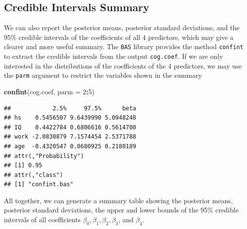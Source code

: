 \documentclass[]{book}
\newenvironment{Shaded}{\begin{snugshade}}{\end{snugshade}}
\newcommand{\KeywordTok}[1]{\textcolor[rgb]{0.13,0.29,0.53}{\textbf{#1}}}
\newcommand{\DataTypeTok}[1]{\textcolor[rgb]{0.13,0.29,0.53}{#1}}
\newcommand{\DecValTok}[1]{\textcolor[rgb]{0.00,0.00,0.81}{#1}}
\newcommand{\StringTok}[1]{\textcolor[rgb]{0.31,0.60,0.02}{#1}}
\newcommand{\CommentTok}[1]{\textcolor[rgb]{0.56,0.35,0.01}{\textit{#1}}}
\newcommand{\OperatorTok}[1]{\textcolor[rgb]{0.81,0.36,0.00}{\textbf{#1}}}
\newcommand{\NormalTok}[1]{#1}
\theoremstyle{definition}
\theoremstyle{definition}
\theoremstyle{definition}
\theoremstyle{remark}
\begin{document}
\subsection{Credible Intervals
Summary}\label{credible-intervals-summary}

We can also report the posterior means, posterior standard deviations,
and the 95\% credible intervals of the coefficients of all 4 predictors,
which may give a clearer and more useful summary. The \texttt{BAS}
library provides the method \texttt{confint} to extract the credible
intervals from the output \texttt{cog.coef}. If we are only interested
in the distributions of the coefficients of the 4 predictors, we may use
the \texttt{parm} argument to restrict the variables shown in the
summary

\begin{Shaded}
\begin{Highlighting}[]
\KeywordTok{confint}\NormalTok{(cog.coef, }\DataTypeTok{parm =} \DecValTok{2}\OperatorTok{:}\DecValTok{5}\NormalTok{)}
\end{Highlighting}
\end{Shaded}

\begin{verbatim}
##            2.5%     97.5%      beta
## hs    0.5456507 9.6439990 5.0948248
## IQ    0.4422784 0.6806616 0.5614700
## work -2.0830879 7.1574454 2.5371788
## age  -0.4320547 0.8680925 0.2180189
## attr(,"Probability")
## [1] 0.95
## attr(,"class")
## [1] "confint.bas"
\end{verbatim}

All together, we can generate a summary table showing the posterior
means, posterior standard deviations, the upper and lower bounds of the
95\% credible intervals of all coefficients
\(\beta_0, \beta_1, \beta_2, \beta_3\), and \(\beta_4\).

\begin{Shaded}
\end{Shaded}
\end{document}
